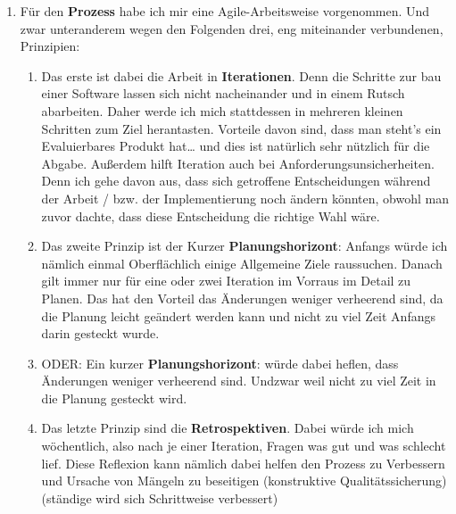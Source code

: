 {\begin{enumerate}
		\item Für den \textbf{Prozess} habe ich mir eine Agile-Arbeitsweise vorgenommen. Und zwar unteranderem wegen den Folgenden drei, eng miteinander verbundenen, Prinzipien:
		\begin{enumerate}
			\item Das erste ist dabei die Arbeit in \textbf{Iterationen}. Denn die Schritte zur bau einer Software lassen sich nicht nacheinander und in einem Rutsch abarbeiten. Daher werde ich mich stattdessen in mehreren kleinen Schritten zum Ziel herantasten. Vorteile davon sind, dass man steht's ein Evaluierbares Produkt hat… und dies ist natürlich sehr nützlich für die Abgabe. Außerdem hilft Iteration auch bei Anforderungsunsicherheiten. Denn ich gehe davon aus, dass sich getroffene Entscheidungen während der Arbeit / bzw. der Implementierung noch ändern könnten, obwohl man zuvor dachte, dass diese Entscheidung die richtige Wahl wäre.
			\item Das zweite Prinzip ist der Kurzer \textbf{Planungshorizont}: Anfangs würde ich nämlich einmal Oberflächlich einige Allgemeine Ziele raussuchen. Danach gilt immer nur für eine oder zwei Iteration im Vorraus im Detail zu Planen. Das hat den Vorteil das Änderungen weniger verheerend sind, da die Planung leicht geändert werden kann und nicht zu viel Zeit Anfangs darin gesteckt wurde.
			\item ODER: Ein kurzer \textbf{Planungshorizont}: würde dabei heflen, dass Änderungen weniger verheerend sind. Undzwar weil nicht zu viel Zeit in die Planung gesteckt wird.
			\item Das letzte Prinzip sind die \textbf{Retrospektiven}. Dabei würde ich mich wöchentlich, also nach je einer Iteration, Fragen was gut und was schlecht lief. Diese Reflexion kann nämlich dabei helfen den Prozess zu Verbessern und Ursache von Mängeln zu beseitigen (konstruktive Qualitätssicherung) (ständige wird sich Schrittweise verbessert)
		\end{enumerate}
	\end{enumerate}
	
	
}%